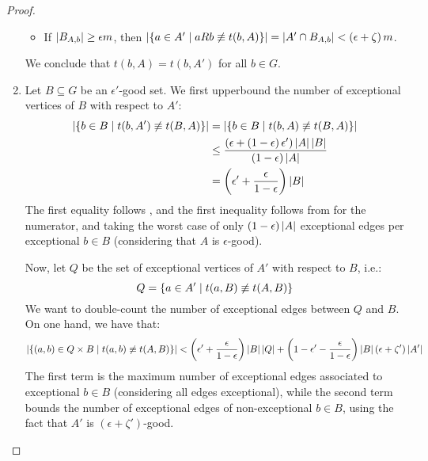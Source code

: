 \begin{lemma}[Claim 5.13]
\begin{proof}
\begin{enumerate}[label=(\alph*), ref=\alph*]
\begin{itemize}
                    \item If $\left| B_{A,b} \right| \geq \epsilon m$, then
                        $\left| \left\{ a \in A' \mid a R b \not \equiv t(b,A) \right\} \right| = \left| A' \cap B_{A,b} \right|
                        < \left( \epsilon + \zeta \right) m$.
                \end{itemize}
            We conclude that $t(b,A) = t(b,A')$ for all $b \in G$.
            \item Let $B \subseteq G$ be an $\epsilon'$-good set.
                We first upperbound the number of exceptional vertices of $B$ with respect to $A'$:
                \begin{align*}
                    \left| \left\{ b \in B \mid t(b, A') \not\equiv t(B,A) \right\} \right|
                        & = \left| \left\{ b \in B \mid t(b, A) \not\equiv t(B,A) \right\} \right| \\
                        & \leq \frac{\left( \epsilon + \left( 1 - \epsilon \right) \epsilon' \right)\left| A \right|\left| B \right|}
                            {\left( 1 - \epsilon \right)\left| A \right|} \\
                        & = \left( \epsilon' + \frac{\epsilon}{1 - \epsilon} \right)\left| B \right|
                \end{align*}
                The first equality follows , and the first inequality follows from
                 for the numerator, and taking the worst case of only
                $(1 - \epsilon) \left| A \right|$ exceptional edges per exceptional $b \in B$
                (considering that $A$ is $\epsilon$-good).

                Now, let $Q$ be the set of exceptional vertices of $A'$ with respect to $B$, i.e.:
                \[
                    Q = \left\{ a \in A' \mid t(a, B) \not\equiv t(A, B) \right\}
                \]
                We want to double-count the number of exceptional edges between $Q$ and $B$.
                On one hand, we have that:
                \[
                    \left| \left\{ (a,b) \in Q \times B \mid t(a, b) \not\equiv t(A, B) \right\} \right| <
                    \left( \epsilon' + \frac{\epsilon}{1 - \epsilon} \right) \left| B \right| \left| Q \right| +
                    \left( 1 - \epsilon' - \frac{\epsilon}{1 - \epsilon} \right) \left| B \right| \left( \epsilon + \zeta' \right) \left| A' \right|
                \]
                The first term is the maximum number of exceptional edges associated to exceptional $b \in B$
                (considering all edges exceptional), while the second term bounds the number of exceptional edges of
                non-exceptional $b \in B$, using the fact that $A'$ is $(\epsilon + \zeta')$-good.


\end{enumerate}
\end{proof}
\end{lemma}
